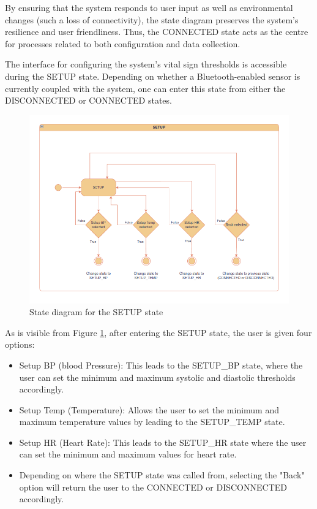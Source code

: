 By ensuring that the system responds to user input as well as environmental changes (such a loss of connectivity), the state diagram preserves the system's resilience and user friendliness. Thus, the CONNECTED state acts as the centre for processes related to both configuration and data collection.

The interface for configuring the system's vital sign thresholds is accessible during the SETUP state. Depending on whether a Bluetooth-enabled sensor is currently coupled with the system, one can enter this state from either the DISCONNECTED or CONNECTED states.

\begin{figure}[H]
	\centering
	\includegraphics[width=\textwidth]{diagrams/states_setup}
	\caption{State diagram for the SETUP state}
	\label{fig:states_setup}
\end{figure}

As is visible from Figure \ref{fig:states_setup}, after entering the SETUP state, the user is given four options:

\begin{itemize}
	\item Setup BP (blood Pressure): This leads to the SETUP\_BP state, where the user can set the minimum and maximum systolic and diastolic thresholds accordingly.
	\item Setup Temp (Temperature): Allows the user to set the minimum and maximum temperature values by leading to the SETUP\_TEMP state.
	\item Setup HR (Heart Rate): This leads to the SETUP\_HR state where the user can set the minimum and maximum values for heart rate.
	\item Depending on where the SETUP state was called from, selecting the "Back" option will return the user to the CONNECTED or DISCONNECTED accordingly.
\end{itemize}

